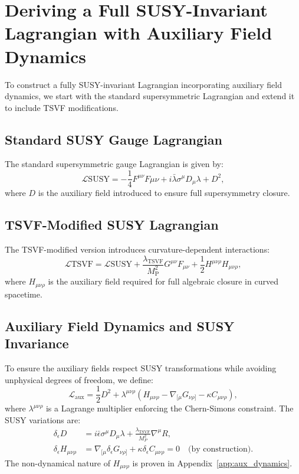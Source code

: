 \documentclass[12pt, onecolumn]{article}
\theoremstyle{definition}
\newcommand{\tsvf}{\lambda_{\mathrm{TSVF}}}
\newcommand{\Mp}{M_{\mathrm{P}}}
\numberwithin{equation}{section}
\begin{document}
\section{Deriving a Full SUSY-Invariant Lagrangian with Auxiliary Field Dynamics}
To construct a fully SUSY-invariant Lagrangian incorporating auxiliary field dynamics, we start with the standard supersymmetric Lagrangian and extend it to include TSVF modifications.

\subsection{Standard SUSY Gauge Lagrangian}
The standard supersymmetric gauge Lagrangian is given by:
\begin{equation}
\mathcal{L}{\text{SUSY}} = -\frac{1}{4} F^{\mu\nu} F{\mu\nu} + i \bar{\lambda} \sigma^\mu D_\mu \lambda + D^2,
\end{equation}
where $D$ is the auxiliary field introduced to ensure full supersymmetry closure.

\subsection{TSVF-Modified SUSY Lagrangian}
The TSVF-modified version introduces curvature-dependent interactions:
\begin{equation}
\mathcal{L}{\text{TSVF}} = \mathcal{L}{\text{SUSY}} + \frac{\tsvf}{\Mp^2} G^{\mu\nu} F_{\mu\nu} + \frac{1}{2} H^{\mu\nu\rho} H_{\mu\nu\rho},
\end{equation}
where $H_{\mu\nu\rho}$ is the auxiliary field required for full algebraic closure in curved spacetime.

\subsection{Auxiliary Field Dynamics and SUSY Invariance}
\label{subsec:auxiliary}

To ensure the auxiliary fields respect SUSY transformations while avoiding unphysical degrees of freedom, we define:
\begin{equation}
\mathcal{L}_{\text{aux}} = \frac{1}{2}D^2 + \lambda^{\mu\nu\rho}\left(H_{\mu\nu\rho} - \nabla_{[\mu}G_{\nu\rho]} - \kappa C_{\mu\nu\rho}\right),
\end{equation}
where \(\lambda^{\mu\nu\rho}\) is a Lagrange multiplier enforcing the Chern-Simons constraint. The SUSY variations are:
\begin{align}
\delta_\epsilon D &= i\bar{\epsilon}\sigma^\mu D_\mu\lambda + \frac{\tsvf}{M_P^2}\nabla^\mu R, \\
\delta_\epsilon H_{\mu\nu\rho} &= \nabla_{[\mu}\delta_\epsilon G_{\nu\rho]} + \kappa\delta_\epsilon C_{\mu\nu\rho} = 0 \quad \text{(by construction)}. 
\end{align}
The non-dynamical nature of \(H_{\mu\nu\rho}\) is proven in Appendix~\ref{app:aux_dynamics}.
\end{document}
